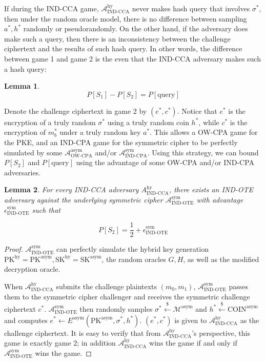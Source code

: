 \documentclass{article}
\newcommand{\leftsample}{\overset{{\scriptscriptstyle\$}}{\leftarrow}}
\newtheorem{lemma}{Lemma}[theorem]
\begin{document}
If during the IND-CCA game, $\mathcal{A}^\text{hy}_\text{IND-CCA}$ never makes hash query that involves $\sigma^\ast$, then under the random oracle model, there is no difference between sampling $a^\ast, h^\ast$ randomly or pseudorandomly. On the other hand, if the adversary does make such a query, then there is an inconsistency between the challenge ciphertext and the results of such hash query. In other words, the difference between game 1 and game 2 is the even that the IND-CCA adversary makes such a hash query:

\begin{lemma}
    $$
    P[S_1] - P[S_2] = P[\text{query}]
    $$
\end{lemma}

Denote the challenge ciphertext in game 2 by $(e^\ast, c^\ast)$. Notice that $e^\ast$ is the encryption of a truly random $\sigma^\ast$ using a truly random coin $h^\ast$, while $c^\ast$ is the encryption of $m_b^\ast$ under a truly random key $a^\ast$. This allows a OW-CPA game for the PKE, and an IND-CPA game for the symmetric cipher to be perfectly simulated by some $\mathcal{A}^\text{asym}_\text{OW-CPA}$ and/or $\mathcal{A}^\text{sym}_\text{IND-CPA}$. Using this strategy, we can bound $P[S_2]$ and $P[\text{query}]$ using the advantage of some OW-CPA and/or IND-CPA adversaries.

\begin{lemma}\label{fo-bound-s2}
    For every IND-CCA adversary $A^\text{hy}_\text{IND-CCA}$, there exists an IND-OTE adversary against the underlying symmetric cipher $\mathcal{A}^\text{sym}_\text{IND-OTE}$ with advantage $\epsilon^\text{sym}_\text{IND-OTE}$ such that

    $$
    P[S_2] = \frac{1}{2} + \epsilon^\text{sym}_\text{IND-OTE}
    $$
\end{lemma}

\begin{proof}
    $\mathcal{A}^\text{sym}_\text{IND-OTE}$ can perfectly simulate the hybrid key generation $\text{PK}^\text{hy} = \text{PK}^\text{asym}, \text{SK}^\text{hy} = \text{SK}^\text{asym}$, the random oracles $G, H$, as well as the modified decryption oracle.
    
    When $\mathcal{A}^\text{hy}_\text{IND-CCA}$ submits the challenge plaintexts $(m_0, m_1)$, $\mathcal{A}^\text{sym}_\text{IND-OTE}$ passes them to the symmetric cipher challenger and receives the symmetric challenge ciphertext $c^\ast$. $\mathcal{A}^\text{sym}_\text{IND-OTE}$ then randomly samples $\sigma^\ast \leftsample \mathcal{M}^\text{asym}$ and $h^\ast \leftsample \text{COIN}^\text{asym}$ and computes $e^\ast \leftarrow E^\text{asym}(\text{PK}^\text{asym}, \sigma^\ast, h^\ast)$. $(e^\ast, c^\ast)$ is given to $\mathcal{A}^\text{hy}_\text{IND-CCA}$ as the challenge ciphertext. It is easy to verify that from $\mathcal{A}^\text{hy}_\text{IND-CCA}$'s perspective, this game is exactly game 2; in addition $\mathcal{A}^\text{hy}_\text{IND-CCA}$ wins the game if and only if $\mathcal{A}^\text{sym}_\text{IND-OTE}$ wins the game.
\end{proof}
\end{document}
